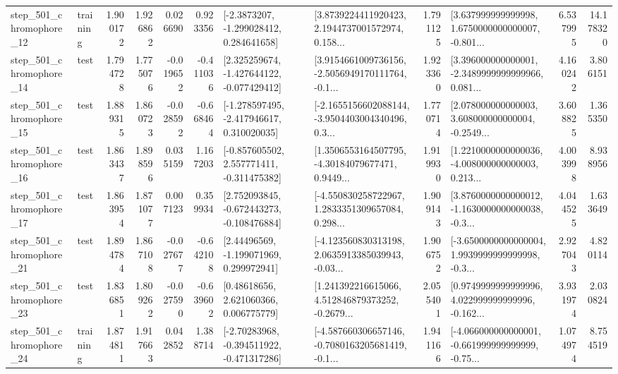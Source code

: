 \begin{tabular}{llrrrrllrlrr}
  step\_501\_chromophore\_12 &  training &      1.900172 &    1.926862 &      0.026690 &  0.923356 &     [-2.3873207, -1.299028412, 0.284641658] &  [3.8739224411920423, 2.1944737001572974, 0.158... &       1.791125 &  [3.637999999999998, 1.6750000000000007, -0.801... &            6.537995 &         14.178320 \\
  step\_501\_chromophore\_14 &      test &      1.794728 &    1.775076 &     -0.019652 & -0.411036 &   [2.325259674, -1.427644122, -0.077429412] &  [3.9154661009736156, -2.5056949170111764, -0.1... &       1.923360 &  [3.396000000000001, -2.3489999999999966, 0.081... &            4.160242 &          3.806151 \\
  step\_501\_chromophore\_15 &      test &      1.889315 &    1.860723 &     -0.028592 & -0.668464 &   [-1.278597495, -2.417946617, 0.310020035] &  [-2.1655156602088144, -3.9504403004340496, 0.3... &       1.770714 &  [2.078000000000003, 3.608000000000004, -0.2549... &            3.608825 &          1.365350 \\
  step\_501\_chromophore\_16 &      test &      1.863437 &    1.898596 &      0.035159 &  1.167203 &   [-0.857605502, 2.557771411, -0.311475382] &  [1.3506553164507795, -4.30184079677471, 0.9449... &       1.919930 &  [1.2210000000000036, -4.008000000000003, 0.213... &            4.003998 &          8.938956 \\
  step\_501\_chromophore\_17 &      test &      1.863954 &    1.871077 &      0.007123 &  0.359934 &   [2.752093845, -0.672443273, -0.108476884] &  [-4.550830258722967, 1.2833351309657084, 0.298... &       1.909143 &  [3.8760000000000012, -1.1630000000000038, -0.3... &            4.044525 &          1.633649 \\
  step\_501\_chromophore\_21 &      test &      1.894784 &    1.867108 &     -0.027677 & -0.642108 &     [2.44496569, -1.199071969, 0.299972941] &  [-4.123560830313198, 2.0635913385039943, -0.03... &       1.906752 &  [-3.6500000000000004, 1.9939999999999998, -0.3... &            2.927043 &          4.820114 \\
  step\_501\_chromophore\_23 &      test &      1.836851 &    1.809262 &     -0.027590 & -0.639602 &      [0.48618656, 2.621060366, 0.006775779] &  [1.241392216615066, 4.512846879373252, -0.2679... &       2.055401 &  [0.9749999999999996, 4.022999999999996, -0.162... &            3.931974 &          2.030824 \\
  step\_501\_chromophore\_24 &  training &      1.874811 &    1.917663 &      0.042852 &  1.388714 &   [-2.70283968, -0.394511922, -0.471317286] &  [-4.587660306657146, -0.7080163205681419, -0.1... &       1.941166 &  [-4.066000000000001, -0.661999999999999, -0.75... &            1.074974 &          8.754519 \\

\end{tabular}
